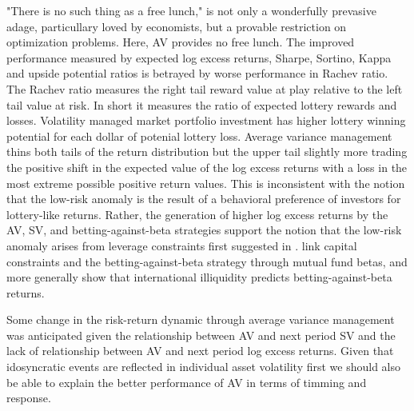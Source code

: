 "There is no such thing as a free lunch," is not only a wonderfully prevasive adage, particullary loved by economists, but a provable restriction on optimization problems.\citep{wolpert_no_1997} Here, AV provides no free lunch. The improved performance measured by expected log excess returns, Sharpe, Sortino, Kappa and upside potential ratios is betrayed by worse performance in Rachev ratio. The Rachev ratio measures the right tail reward value at play relative to the left tail value at risk. In short it measures the ratio of expected lottery rewards and losses. Volatility managed market portfolio investment has higher lottery winning potential for each dollar of potenial lottery loss. Average variance management thins both tails of the return distribution but the upper tail slightly more trading the positive shift in the expected value of the log excess returns with a loss in the most extreme possible positive return values. This is inconsistent with the notion that the low-risk anomaly is the result of a behavioral preference of investors for lottery-like returns.\citep{barberis_stocks_2008,brunnermeier_optimal_2007} Rather, the generation of higher log excess returns by the AV, SV, and betting-against-beta strategies support the notion that the low-risk anomaly arises from leverage constraints first suggested in \citet{jensen1972capital}. \citet{boguth_leverage_2018} link capital constraints and the betting-against-beta strategy through mutual fund betas, and more generally \citet{malkhozov_international_2017} show that international illiquidity predicts betting-against-beta returns. 

Some change in the risk-return dynamic through average variance management was anticipated given the relationship between AV and next period SV and the lack of relationship between AV and next period log excess returns. Given that idosyncratic events are reflected in individual asset volatility first we should also be able to explain the better performance of AV in terms of timming and response. 
